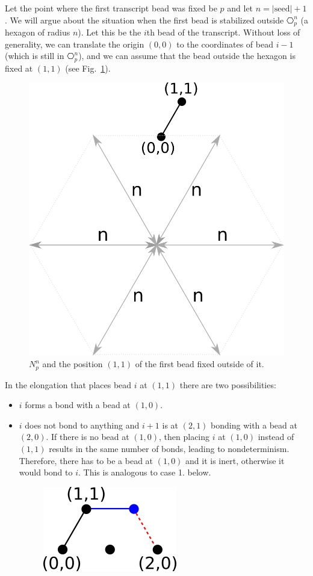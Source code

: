 \documentclass[runningheads]{llncs}
\begin{document}
Let the point where the first transcript bead was fixed be $p$ and let $n=|\mathrm{seed}|+1$. We will argue about the situation when the first bead is stabilized outside $\hexagon_p^n$ (a hexagon of radius $n$). Let this be the $i$th bead of the transcript. Without loss of generality, we can translate the origin $(0,0)$ to the coordinates of bead $i-1$ (which is still in $\hexagon_p^n$), and we can assume that the bead outside the hexagon is fixed at $(1,1)$ (see Fig.~\ref{fig:hexagonOut}).
\begin{figure}
	\centering
	\includegraphics[width=0.3\linewidth]{./Fig/hexagonOut}
	\caption{$N_p^n$ and the position $(1,1)$ of the first bead fixed outside of it.}
	\label{fig:hexagonOut}
\end{figure}

In the elongation that places bead $i$ at $(1,1)$ there are two possibilities:
\begin{itemize}
	\item $i$ forms a bond with a bead at $(1,0)$.
	\item  $i$ does not bond to anything and $i+1$ is at $(2,1)$ bonding with a bead at $(2,0)$. If there is no bead at $(1,0)$, then placing $i$ at $(1,0)$ instead of $(1,1)$ results in the same number of bonds, leading to nondeterminism. Therefore, there has to be a bead at $(1,0)$ and it is inert, otherwise it would bond to $i$. This is analogous to case 1. below.%
	\begin{figure}
		\centering
		\includegraphics[width=0.2\linewidth]{./Fig/hexagonOut1}
		\label{fig:hexagonOut1}
	\end{figure}
	
\end{itemize}
 
\end{document}
